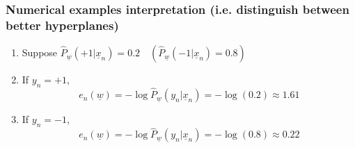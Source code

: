     \subsubsection{Numerical examples interpretation (i.e. distinguish between better hyperplanes)}
    \begin{example}
        \begin{enumerate}
            \item Suppose $\hat{P}_{\underline{w}}(+1 | \underline{x}_n) = 0.2 \quad (\hat{P}_{\underline{w}}(-1 | \underline{x}_n) = 0.8)$
            
            \item If \( y_n = +1 \), 
            \[
            e_n(\underline{w}) = -\log \hat{P}_{\underline{w}}(y_n | \underline{x}_n) = -\log(0.2) \approx 1.61
            \]
        
            \item If \( y_n = -1 \), 
            \[
            e_n(\underline{w}) = -\log \hat{P}_{\underline{w}}(y_n | \underline{x}_n) = -\log(0.8) \approx 0.22
            \]
        \end{enumerate}
        
    \end{example}

